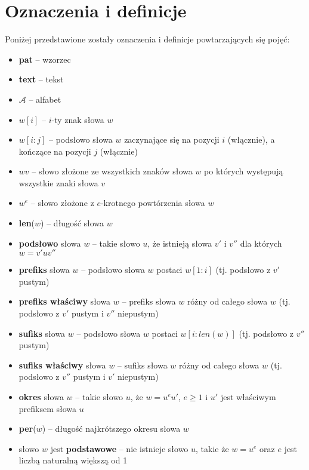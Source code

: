 \section{Oznaczenia i definicje}
Poniżej przedstawione zostały oznaczenia i definicje powtarzających się pojęć:
\begin{itemize}
    \item \textbf{pat} -- wzorzec
    \item \textbf{text} -- tekst
    \item $\mathcal{A}$ -- alfabet
    \item $w[i]$ -- $i$-ty znak słowa $w$
    \item $w[i:j]$ -- podsłowo słowa $w$ zaczynające się na pozycji $i$ (włącznie), a kończące na pozycji $j$ (włącznie)
    \item $wv$ -- słowo złożone ze wszystkich znaków słowa $w$ po których występują wszystkie znaki słowa $v$
    \item $w^{e}$ -- słowo złożone z $e$-krotnego powtórzenia słowa $w$
    \item \textbf{len}($w$) -- długość słowa $w$
    \item \textbf{podsłowo} słowa $w$ -- takie słowo $u$, że istnieją słowa $v'$ i $v''$ dla których $w=v'uv''$
    \item \textbf{prefiks} słowa $w$ -- podsłowo słowa $w$ postaci $w[1:i]$ (tj. podsłowo z $v'$ pustym)
    \item \textbf{prefiks właściwy} słowa $w$ -- prefiks słowa $w$ różny od całego słowa $w$ (tj. podsłowo z $v'$ pustym i $v''$ niepustym)
    \item \textbf{sufiks} słowa $w$ -- podsłowo słowa $w$ postaci $w[i:len(w)]$ (tj. podsłowo z $v''$ pustym)
    \item \textbf{sufiks właściwy} słowa $w$ -- sufiks słowa $w$ różny od całego słowa $w$ (tj. podsłowo z $v''$ pustym i $v'$ niepustym)
    \item \textbf{okres} słowa $w$ -- takie słowo $u$, że $w=u^{e}u'$, $e \geq 1$ i $u'$ jest właściwym prefiksem słowa $u$
    \item \textbf{per}($w$) -- długość najkrótszego okresu słowa $w$
    \item słowo $w$ jest \textbf{podstawowe} -- nie istnieje słowo $u$, takie że $w=u^{e}$ oraz $e$ jest liczbą naturalną większą od 1
\end{itemize}